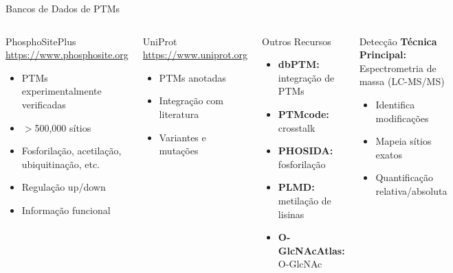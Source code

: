 \begin{frame}[shrink=10]{Bancos de Dados de PTMs}
\begin{columns}
\begin{block}{PhosphoSitePlus}
\url{https://www.phosphosite.org}
\begin{itemize}
    \item PTMs experimentalmente verificadas
    \item $>$500,000 sítios
    \item Fosforilação, acetilação, ubiquitinação, etc.
    \item Regulação up/down
    \item Informação funcional
\end{itemize}
\end{block}

\begin{block}{UniProt}
\url{https://www.uniprot.org}
\begin{itemize}
    \item PTMs anotadas
    \item Integração com literatura
    \item Variantes e mutações
\end{itemize}
\end{block}

\begin{block}{Outros Recursos}
\begin{itemize}
    \item \textbf{dbPTM:} integração de PTMs
    \item \textbf{PTMcode:} crosstalk
    \item \textbf{PHOSIDA:} fosforilação
    \item \textbf{PLMD:} metilação de lisinas
    \item \textbf{O-GlcNAcAtlas:} O-GlcNAc
\end{itemize}
\end{block}

\vspace{0.3cm}

\begin{exampleblock}{Detecção}
\textbf{Técnica Principal:}\\
Espectrometria de massa (LC-MS/MS)
\begin{itemize}
    \item Identifica modificações
    \item Mapeia sítios exatos
    \item Quantificação relativa/absoluta
\end{itemize}
\end{exampleblock}
\end{columns}
\end{frame}

